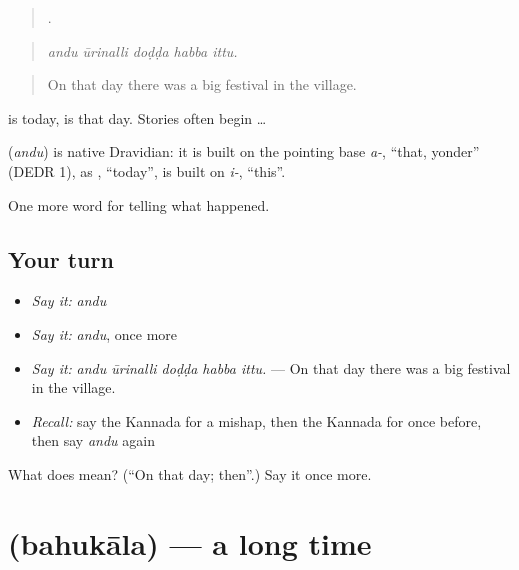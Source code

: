 \begin{quote}
    .
\end{quote}

\begin{quote}
\emph{andu ūrinalli doḍḍa habba ittu.}
\end{quote}

\begin{quote}
On that day there was a big festival in the village.
\end{quote}

 is today,  is that day. Stories often begin  …

\begin{cousinweb}
\textbf{} (\emph{andu}) is native Dravidian: it is built on the pointing base \emph{a-}, \textquotedblleft{}that, yonder\textquotedblright{} (DEDR 1), as , \textquotedblleft{}today\textquotedblright{}, is built on \emph{i-}, \textquotedblleft{}this\textquotedblright{}.
\end{cousinweb}

\begin{grammarlens}[title={What you've built}]
One more word for telling what happened.
\end{grammarlens}

\subsection*{Your turn}
\begin{itemize}
\raggedright
  \item \emph{Say it:} \emph{andu}
  \item \emph{Say it:} \emph{andu}, once more
  \item \emph{Say it:} \emph{andu ūrinalli doḍḍa habba ittu.} — On that day there was a big festival in the village.
  \item \emph{Recall:} say the Kannada for a mishap, then the Kannada for once before, then say \emph{andu} again
\end{itemize}

\begin{tcolorbox}[breakable,colback=teal!4,colframe=teal!35!black,title={Before you move on}]
What does  mean? (\textquotedblleft{}On that day; then\textquotedblright{}.) Say it once more.
\end{tcolorbox}
\section[\texorpdfstring{\kn{ಬಹುಕಾಲ} (bahukāla)}{ಬಹುಕಾಲ (bahukāla)}]{ (bahukāla) — a long time}

